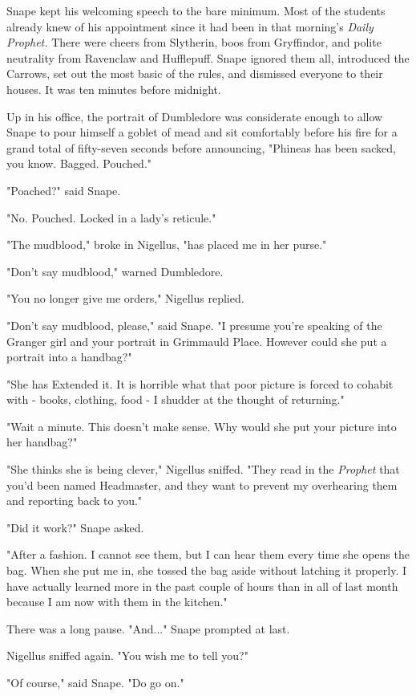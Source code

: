 \documentclass[a4paper,11pt]{article}
\begin{document}
Snape kept his welcoming speech to the bare minimum. Most of the students already knew of his appointment since it had been in that morning's \emph{Daily Prophet.} There were cheers from Slytherin, boos from Gryffindor, and polite neutrality from Ravenclaw and Hufflepuff. Snape ignored them all, introduced the Carrows, set out the most basic of the rules, and dismissed everyone to their houses. It was ten minutes before midnight.

Up in his office, the portrait of Dumbledore was considerate enough to allow Snape to pour himself a goblet of mead and sit comfortably before his fire for a grand total of fifty-seven seconds before announcing, "Phineas has been sacked, you know. Bagged. Pouched."

"Poached?" said Snape.

"No. Pouched. Locked in a lady's reticule."

"The mudblood," broke in Nigellus, "has placed me in her purse."

"Don't say mudblood," warned Dumbledore.

"You no longer give me orders," Nigellus replied.

"Don't say mudblood, please," said Snape. "I presume you're speaking of the Granger girl and your portrait in Grimmauld Place. However could she put a portrait into a handbag?"

"She has Extended it. It is horrible what that poor picture is forced to cohabit with - books, clothing, food - I shudder at the thought of returning."

"Wait a minute. This doesn't make sense. Why would she put your picture into her handbag?"

"She thinks she is being clever," Nigellus sniffed. "They read in the \emph{Prophet} that you'd been named Headmaster, and they want to prevent my overhearing them and reporting back to you."

"Did it work?" Snape asked.

"After a fashion. I cannot see them, but I can hear them every time she opens the bag. When she put me in, she tossed the bag aside without latching it properly. I have actually learned more in the past couple of hours than in all of last month because I am now with them in the kitchen."

There was a long pause. "And..." Snape prompted at last.

Nigellus sniffed again. "You wish me to tell you?"

"Of course," said Snape. "Do go on."
\end{document}
